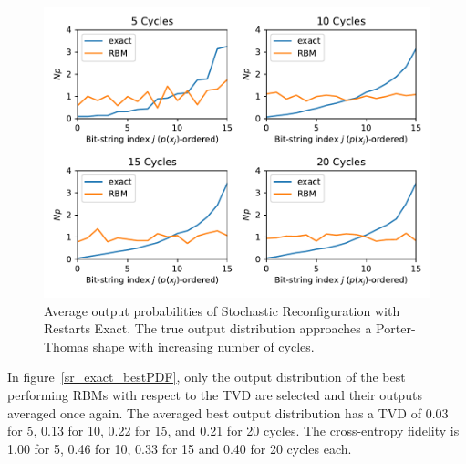 \begin{figure}[H]
  \centering
  \includegraphics[width=\textwidth]{figures/results/SR-restarts-not-learned/avgPDF.pdf}
  \caption[Average output probabilities of Stochastic Reconfiguration with Restarts Exact]{
    Average output probabilities of Stochastic Reconfiguration with Restarts Exact. The true 
    output distribution approaches a Porter-Thomas shape with increasing number of cycles.}
  \label{fig:sr_exact_avgPDF}
\end{figure}

In figure~\ref{sr_exact_bestPDF}, only the output distribution of the best performing RBMs with respect to the 
TVD are selected and their outputs averaged once again. The averaged best output distribution 
has a TVD of 0.03 for 5, 0.13 for 10, 0.22 for 15, and 0.21 for 20 
cycles. The cross-entropy fidelity is 1.00 for 5, 0.46 for 10, 0.33 for 15 and 0.40 for 20 cycles each. 


